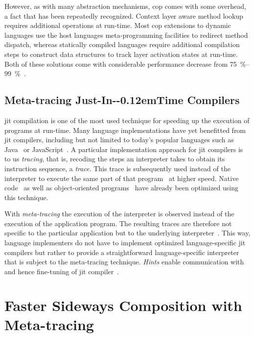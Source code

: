 \documentclass[preprint,english,10pt,nonatbib]{sigplanconf}
\begin{document}

However, as with many abstraction mechanisms, \ac{cop} comes with some overhead,
a fact that has been repeatedly recognized. Context layer aware method lookup
requires additional operations at run-time. Most \ac{cop} extensions to dynamic
languages use the host languages meta-programming facilities to redirect method
dispatch, whereas statically compiled languages require additional compilation
steps to construct data structures to track layer activation states at
run-time. Both of these solutions come with considerable performance decrease
from \SIrange{75}{99}{\percent}~\cite{appeltauer+:2009:comparison-context-oriented}.


\subsection{Meta-tracing Just-In-\kern-0.12emTime Compilers}
\label{sec:meta-tracing-jit}

\Acf{jit} compilation is one of the most used technique for speeding up the
execution of programs at run-time. Many language implementations have yet
benefitted from \ac{jit} compilers, including but not limited to today's
popular languages such as Java~\cite{paleczny+:2001:java-hotspot} or
JavaScript~\cite{holtta:2013:crankshafting-from}. A particular implementation
approach for \ac{jit} compilers is to us \emph{tracing}, that is, recoding the
steps an interpreter takes to obtain its instruction sequence, a \emph{trace}.
This trace is subsequently used instead of the interpreter to execute the same
part of that program~\cite{mitchell:1970:design-construction} at higher speed.
Native code~\cite{bala+:2000:dynamo:-transparent} as well as object-oriented
programs~\cite{gal+:2006:hotpathvm:-effective} have already been optimized
using this technique.

With \emph{meta-tracing} the execution of the interpreter is observed instead
of the execution of the application program. The resulting traces are therefore
not specific to the particular application but to the underlying
interpreter~\cite{bolz+:2009:tracing-meta-level:}. This way, language
implementers do not have to implement optimized language-specific \ac{jit}
compilers but rather to provide a straightforward language-specific interpreter
that is subject to the meta-tracing technique. \emph{Hints} enable
communication with and hence fine-tuning of \ac{jit}
compiler~\cite{bolz_runtime_2011}.

\section{Faster Sideways Composition with Meta-tracing}
\end{document}
